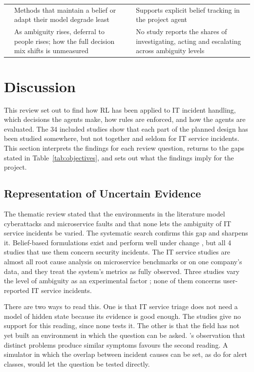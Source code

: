 \documentclass[pdflatex,sn-basic]{sn-jnl}
\begin{document}
{\begin{longtable}{@{}lP{2.7cm}P{4.3cm}P{3.7cm}@{}}
 & Methods that maintain a belief or adapt their model degrade least & \citealp{hammar2025,hammar2026belief} & Supports explicit belief tracking in the project agent \\
 & As ambiguity rises, deferral to people rises; how the full decision mix shifts is unmeasured & \citealp{sahin2026,kovtun2026,contractor2025} & No study reports the shares of investigating, acting and escalating across ambiguity levels \\
\end{longtable}
}

\section{Discussion}
\label{sec:discussion}

This review set out to find how RL has been applied to IT incident handling, which decisions the agents make, how rules are enforced, and how the agents are evaluated. The 34 included studies show that each part of the planned design has been studied somewhere, but not together and seldom for IT service incidents. This section interprets the findings for each review question, returns to the gaps stated in Table~\ref{tab:objectives}, and sets out what the findings imply for the project.

\subsection{Representation of Uncertain Evidence}

The thematic review stated that the environments in the literature model cyberattacks and microservice faults and that none lets the ambiguity of IT service incidents be varied. The systematic search confirms this gap and sharpens it. Belief-based formulations exist and perform well under change \citep{hammar2026belief,hammar2025}, but all 4 studies that use them concern security incidents. The IT service studies are almost all root cause analysis on microservice benchmarks or on one company's data, and they treat the system's metrics as fully observed. Three studies vary the level of ambiguity as an experimental factor \citep{contractor2025,sahin2026,wu2026}; none of them concerns user-reported IT service incidents.

There are two ways to read this. One is that IT service triage does not need a model of hidden state because its evidence is good enough. The studies give no support for this reading, since none tests it. The other is that the field has not yet built an environment in which the question can be asked. \citeauthor{chen2020}'s \citeyearpar{chen2020} observation that distinct problems produce similar symptoms favours the second reading. A simulator in which the overlap between incident causes can be set, as \citet{sahin2026} do for alert classes, would let the question be tested directly.
\end{document}
